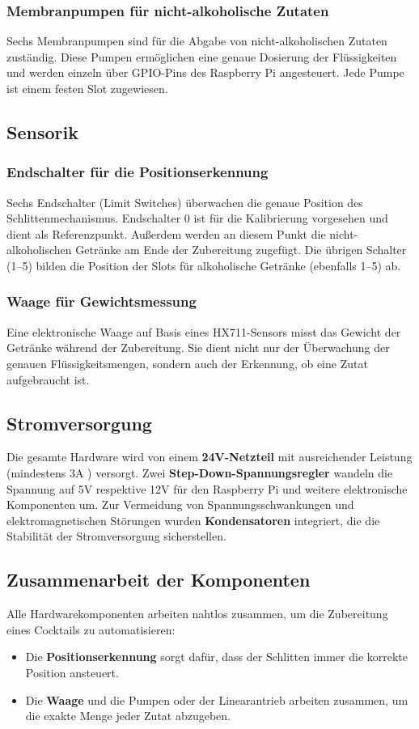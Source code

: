 \subsubsection{Membranpumpen für nicht-alkoholische Zutaten}
Sechs Membranpumpen sind für die Abgabe von nicht-alkoholischen Zutaten zuständig. Diese Pumpen 
ermöglichen eine genaue Dosierung der Flüssigkeiten und werden einzeln über GPIO-Pins des 
Raspberry Pi angesteuert. Jede Pumpe ist einem festen Slot zugewiesen.

\subsection{Sensorik}
\subsubsection{Endschalter für die Positionserkennung}
Sechs Endschalter (Limit Switches) überwachen die genaue Position des Schlittenmechanismus. 
Endschalter 0 ist für die Kalibrierung vorgesehen und dient als Referenzpunkt. Außerdem werden an 
diesem Punkt die nicht-alkoholischen Getränke am Ende der Zubereitung zugefügt. Die übrigen 
Schalter (1--5) bilden die Position der Slots für alkoholische Getränke (ebenfalls 1--5) ab.

\subsubsection{Waage für Gewichtsmessung}
Eine elektronische Waage auf Basis eines HX711-Sensors misst das Gewicht der Getränke während der 
Zubereitung. Sie dient nicht nur der Überwachung der genauen Flüssigkeitsmengen, sondern auch der 
Erkennung, ob eine Zutat aufgebraucht ist.

\subsection{Stromversorgung}
Die gesamte Hardware wird von einem \textbf{24V-Netzteil} mit ausreichender Leistung (mindestens 3A
) versorgt. Zwei \textbf{Step-Down-Spannungsregler} wandeln die Spannung auf 5V respektive 12V für 
den Raspberry Pi und weitere elektronische Komponenten um. Zur Vermeidung von 
Spannungsschwankungen und elektromagnetischen Störungen wurden \textbf{Kondensatoren} integriert, 
die die Stabilität der Stromversorgung sicherstellen.

\subsection{Zusammenarbeit der Komponenten}
Alle Hardwarekomponenten arbeiten nahtlos zusammen, um die Zubereitung eines Cocktails zu 
automatisieren:
\begin{itemize}
    \item Die \textbf{Positionserkennung} sorgt dafür, dass der Schlitten immer die korrekte 
        Position ansteuert.
    \item Die \textbf{Waage} und die Pumpen oder der Linearantrieb arbeiten zusammen, um die 
        exakte Menge jeder Zutat abzugeben.
\end{itemize}

